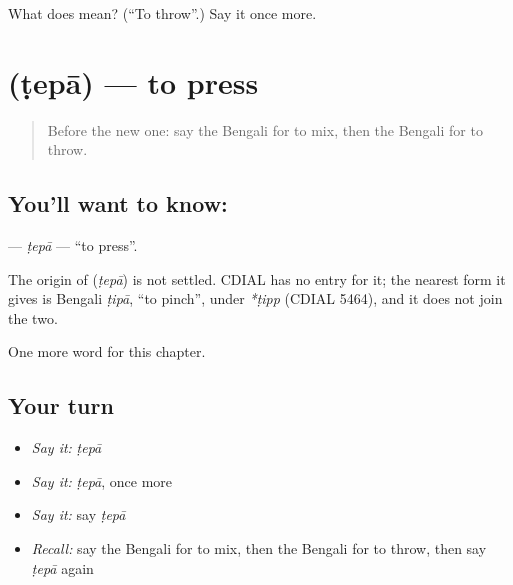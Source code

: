 \begin{tcolorbox}[breakable,colback=teal!4,colframe=teal!35!black,title={Before you move on}]
What does  mean? (\textquotedblleft{}To throw\textquotedblright{}.) Say it once more.
\end{tcolorbox}
\section[\texorpdfstring{\bn{টেপা} (ṭepā)}{টেপা (ṭepā)}]{ (ṭepā) — to press}

\label{lesson:BN-C106-tepa}



\begin{quote}
Before the new one: say the Bengali for to mix, then the Bengali for to throw.
\end{quote}

\subsection*{You'll want to know: }
\textbf{} — \emph{ṭepā} — \textquotedblleft{}to press\textquotedblright{}.

\begin{cousinweb}
The origin of \textbf{} (\emph{ṭepā}) is not settled. CDIAL has no entry for it; the nearest form it gives is Bengali \emph{ṭipā}, \textquotedblleft{}to pinch\textquotedblright{}, under \emph{*ṭipp} (CDIAL 5464), and it does not join the two.
\end{cousinweb}

\begin{grammarlens}[title={What you've built}]
One more word for this chapter.
\end{grammarlens}

\subsection*{Your turn}
\begin{itemize}
\raggedright
  \item \emph{Say it:} \emph{ṭepā}
  \item \emph{Say it:} \emph{ṭepā}, once more
  \item \emph{Say it:} say \emph{ṭepā}
  \item \emph{Recall:} say the Bengali for to mix, then the Bengali for to throw, then say \emph{ṭepā} again
\end{itemize}

